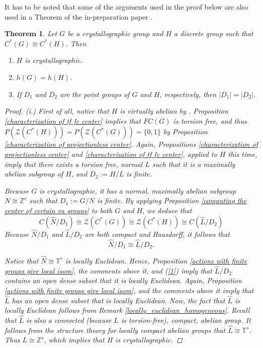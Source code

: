 \documentclass[11pt, twoside]{amsart}
\newtheorem{thm}{Theorem}[section]
\theoremstyle{definition}
\newcommand{\B}{\mathbb}
\newcommand{\Z}{\B{Z}}
\newcommand{\ZZ}{\mathcal{Z}}
\newcommand{\TT}{\mathbb{T}}
\begin{document}
 
 It has to be noted that some of the arguments used in the proof below are also used in a Theorem of the in-preparation paper \cite{Knubyetal}.
\begin{thm}\label{crystallographic_is_preserved}
    Let $G$ be a crystallographic group and $H$ a discrete group such that $C^*(G)\cong C^*(H)$. Then 
    \begin{enumerate}[label=(\roman*.)]
        \item $H$ is crystallographic.
        \item $h(G)=h(H)$.
        \item If $D_1$ and $D_2$ are the point groups of $G$ and $H$, respectively, then $|D_1|=|D_2|$.
    \end{enumerate}
    
    \begin{proof}\mbox{}
    
        {\em (i.)} First of all, notice that $H$ is virtually abelian by \cite{Tho64}. Proposition \ref{characterization of tf fc center} implies that $FC(G)$ is torsion free, and thus $P(\ZZ(C^*(H)))=P(\ZZ(C^*(G)))=\{0,1\}$ by Proposition \ref{characterization of projectionless center}. Again, Propositions \ref{characterization of projectionless center} and \ref{characterization of tf fc center}, applied to $H$ this time, imply that there exists a torsion free, normal $L$ such that it is a maximally abelian subgroup of $H$, and $D_2:=H/L$ is finite. \par
        Because $G$ is crystallographic, it has a normal, maximally abelian subgroup $N\cong \Z^r$ such that $D_1:=G/N$ is finite. By applying Proposition \ref{computing the center of certain va groups} to both $G$ and $H$, we deduce that
        $$C(\widehat{N}/D_1)\cong \ZZ(C^*(G))\cong \ZZ(C^*(H))\cong C(\widehat{L}/D_2)$$
        Because $\widehat{N}/D_1$ and $\widehat{L}/D_2$ are both compact and Hausdorff, it follows that 
        \begin{equation}\label{1}
           \widehat{N}/D_1\cong \widehat{L}/D_2. 
        \end{equation}
        
        Notice that $\widehat{N}\cong \TT^r$ is locally Euclidean. Hence, Proposition \ref{actions with finite groups give local isom}, the comments above it, and (\ref{1}) imply that $\widehat{L}/D_2$ contains an open dense subset that it is locally Euclidean. Again, Proposition \ref{actions with finite groups give local isom}, and the comments above it imply that $\widehat{L}$ has an open dense subset that is locally Euclidean. Now, the fact that $\widehat{L}$ is locally Euclidean follows from Remark \ref{locally_euclidean_homogeneous}. Recall that $\widehat{L}$ is also a connected (because $L$ is torsion-free), compact, abelian group. It follows from the structure theory for locally compact abelian groups \cite[Thm. 4.2.4]{principles_of_harm_anal_book} that $\widehat{L}\cong \TT^s$. Thus $L\cong \Z^s$, which implies that $H$ is crystallographic. 
        

\end{proof}
\end{thm}
\end{document}
